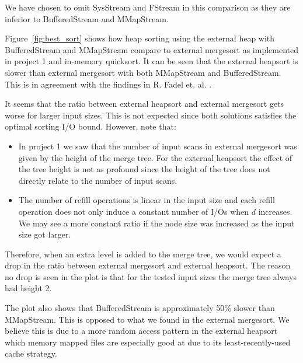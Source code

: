 We have chosen to omit SysStream and FStream in this comparison as they are inferior to BufferedStream and MMapStream.

Figure~\ref{fig:best_sort} shows how heap sorting using the external heap with BufferedStream and MMapStream compare to external mergesort as implemented in project 1 and in-memory quicksort. It can be seen that the external heapsort is slower than external mergesort with both MMapStream and BufferedStream. This is in agreement with the findings in R. Fadel et. al. \citep{Fadel1999345}.

It seems that the ratio between external heapsort and external mergesort gets worse for larger input sizes. This is not expected since both solutions satisfies the optimal sorting I/O bound. However, note that:
\begin{itemize}
\item In project 1 we saw that the number of input scans in external mergesort was given by the height of the merge tree. For the external heapsort the effect of the tree height is not as profound since the height of the tree does not directly relate to the number of input scans.
\item The number of refill operations is linear in the input size and each refill operation does not only induce a constant number of I/Os when $d$ increases. We may see a more constant ratio if the node size was increased as the input size got larger.
\end{itemize}
Therefore, when an extra level is added to the merge tree, we would expect a drop in the ratio between external mergesort and external heapsort. The reason no drop is seen in the plot is that for the tested input sizes the merge tree always had height 2.

The plot also shows that BufferedStream is approximately 50\% slower than MMapStream. This is opposed to what we found in the external mergesort. We believe this is due to a more random access pattern in the external heapsort which memory mapped files are especially good at due to its least-recently-used cache strategy.